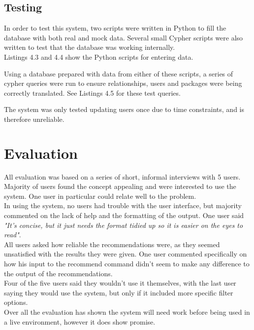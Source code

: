\documentclass{l4proj}
\begin{document}
\section{Testing}
In order to test this system, two scripts were written in Python to fill the database with both real and mock data. Several small Cypher scripts were also written to test that the database was working internally.\\
Listings 4.3 and 4.4 show the Python scripts for entering data.\\
\begin{figure}

\end{figure}
\begin{figure}

\end{figure}
Using a database prepared with data from either of these scripts, a series of cypher queries were run to ensure relationships, users and packages were being correctly translated. See Listings 4.5 for these test queries.\\
\begin{figure}

\end{figure}
The system was only tested updating users once due to time constraints, and is therefore unreliable.\\
 
 
\chapter{Evaluation}
All evaluation was based on a series of short, informal interviews with 5 users.\\
Majority of users found the concept appealing and were interested to use the system. One user in particular could relate well to the problem.\\
In using the system, no users had trouble with the user interface, but majority commented on the lack of help and the formatting of the output. One user said \emph{"It's concise, but it just needs the format tidied up so it is easier on the eyes to read"}.\\
All users asked how reliable the recommendations were, as they seemed unsatisfied with the results they were given. One user commented specifically on how his input to the recommend command didn't seem to make any difference to the output of the recommendations.\\
Four of the five users said they wouldn't use it themselves, with the last user saying they would use the system, but only if it included more specific filter options.\\
Over all the evaluation has shown the system will need work before being used in a live environment, however it does show promise.
 
\end{document}
